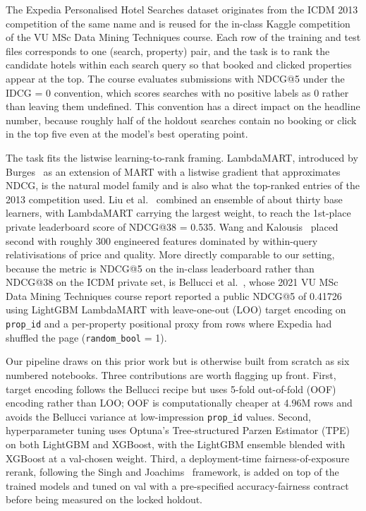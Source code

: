 
The Expedia Personalised Hotel Searches dataset originates from the ICDM 2013 competition of the same name and is reused for the in-class Kaggle competition of the VU MSc Data Mining Techniques course. Each row of the training and test files corresponds to one (search, property) pair, and the task is to rank the candidate hotels within each search query so that booked and clicked properties appear at the top. The course evaluates submissions with NDCG@5 under the IDCG = 0 convention, which scores searches with no positive labels as 0 rather than leaving them undefined. This convention has a direct impact on the headline number, because roughly half of the holdout searches contain no booking or click in the top five even at the model's best operating point.

The task fits the listwise learning-to-rank framing. LambdaMART, introduced by Burges~\cite{burges2010ranknet} as an extension of MART with a listwise gradient that approximates NDCG, is the natural model family and is also what the top-ranked entries of the 2013 competition used. Liu et al.~\cite{liu2013expedia} combined an ensemble of about thirty base learners, with LambdaMART carrying the largest weight, to reach the 1st-place private leaderboard score of NDCG@38 = 0.535. Wang and Kalousis~\cite{wang2014expedia} placed second with roughly 300 engineered features dominated by within-query relativisations of price and quality. More directly comparable to our setting, because the metric is NDCG@5 on the in-class leaderboard rather than NDCG@38 on the ICDM private set, is Bellucci et al.~\cite{bellucci2021dmt}, whose 2021 VU MSc Data Mining Techniques course report reported a public NDCG@5 of 0.41726 using LightGBM LambdaMART with leave-one-out (LOO) target encoding on \texttt{prop\_id} and a per-property positional proxy from rows where Expedia had shuffled the page (\texttt{random\_bool} = 1).

Our pipeline draws on this prior work but is otherwise built from scratch as six numbered notebooks. Three contributions are worth flagging up front. First, target encoding follows the Bellucci recipe but uses 5-fold out-of-fold (OOF) encoding rather than LOO; OOF is computationally cheaper at 4.96M rows and avoids the Bellucci variance at low-impression \texttt{prop\_id} values. Second, hyperparameter tuning uses Optuna's Tree-structured Parzen Estimator (TPE)~\cite{bergstra2011tpe,akiba2019optuna} on both LightGBM and XGBoost, with the LightGBM ensemble blended with XGBoost at a val-chosen weight. Third, a deployment-time fairness-of-exposure rerank, following the Singh and Joachims~\cite{singh2018fairness} framework, is added on top of the trained models and tuned on val with a pre-specified accuracy-fairness contract before being measured on the locked holdout.

